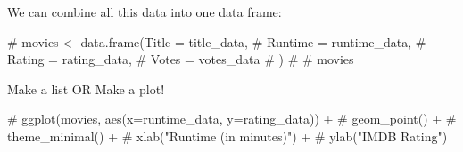 \documentclass[
  letterpaper,
  DIV=11,
  numbers=noendperiod]{scrartcl}
\newenvironment{Shaded}{\begin{snugshade}}{\end{snugshade}}
\newcommand{\CommentTok}[1]{\textcolor[rgb]{0.37,0.37,0.37}{#1}}
\begin{document}
We can combine all this data into one data frame:

\begin{Shaded}
\begin{Highlighting}[]
\CommentTok{\# movies \textless{}{-} data.frame(Title = title\_data,}
\CommentTok{\# Runtime = runtime\_data,}
\CommentTok{\# Rating = rating\_data,}
\CommentTok{\# Votes = votes\_data}
\CommentTok{\# )}
\CommentTok{\# }
\CommentTok{\# movies}
\end{Highlighting}
\end{Shaded}

Make a list OR Make a plot!

\begin{Shaded}
\begin{Highlighting}[]
\CommentTok{\# ggplot(movies, aes(x=runtime\_data, y=rating\_data)) +}
\CommentTok{\#   geom\_point() +}
\CommentTok{\#   theme\_minimal() + }
\CommentTok{\#   xlab("Runtime (in minutes)") +}
\CommentTok{\#   ylab("IMDB Rating")}
\end{Highlighting}
\end{Shaded}
\end{document}
